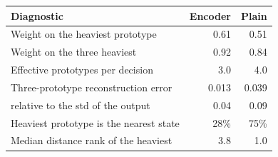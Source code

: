 \begin{tabular}{@{}lrr@{}}
\toprule
Diagnostic & Encoder & Plain \\
\midrule
Weight on the heaviest prototype & 0.61 & 0.51 \\
Weight on the three heaviest & 0.92 & 0.84 \\
Effective prototypes per decision & 3.0 & 4.0 \\
Three-prototype reconstruction error & 0.013 & 0.039 \\
\quad relative to the std of the output & 0.04 & 0.09 \\
Heaviest prototype is the nearest state & 28\% & 75\% \\
Median distance rank of the heaviest & 3.8 & 1.0 \\
\bottomrule
\end{tabular}
